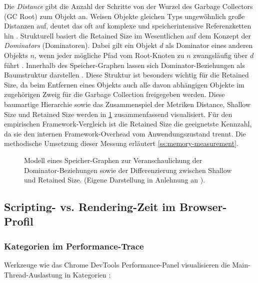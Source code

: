 Die \textit{Distance} gibt die Anzahl der Schritte von der Wurzel des Garbage Collectors (GC Root) zum Objekt an. Weisen Objekte gleichen Typs ungewöhnlich große Distanzen auf, deutet das oft auf komplexe und speicherintensive Referenzketten hin \cite{chrome-memory-terminology-2024}. Strukturell basiert die Retained Size im Wesentlichen auf dem Konzept der \textit{Dominators} (Dominatoren). Dabei gilt ein Objekt $d$ als Dominator eines anderen Objekts $n$, wenn jeder mögliche Pfad vom Root-Knoten zu $n$ zwangsläufig über $d$ führt \cite{bynens-lorenz-memory-profiling}. Innerhalb des Speicher-Graphen lassen sich Dominator-Beziehungen als Baumstruktur darstellen \cite{chrome-memory-terminology-2024}. Diese Struktur ist besonders wichtig für die Retained Size, da beim Entfernen eines Objekts auch alle davon abhängigen Objekte im zugehörigen Zweig für die Garbage Collection freigegeben werden. Diese baumartige Hierarchie sowie das Zusammenspiel der Metriken Distance, Shallow Size und Retained Size werden in \cref{fig:heap_dominator_tree} zusammenfassend visualisiert. Für den empirischen Framework-Vergleich ist die Retained Size die geeignetste Kennzahl, da sie den internen Framework-Overhead vom Anwendungszustand trennt. Die methodische Umsetzung dieser Messung erläutert \cref{ss:memory-measurement}.
\begin{figure}[H]
	\centering
	\caption[Modell eines Speicher-Graphen zur Darstellung der Retained Size]{Modell eines Speicher-Graphen zur Veranschaulichung der Dominator-Beziehungen sowie der Differenzierung zwischen Shallow und Retained Size. (Eigene Darstellung in Anlehnung an \cite{chrome-memory-terminology-2024}).}
	\label{fig:heap_dominator_tree}
\end{figure}

\subsection{Scripting- vs. Rendering-Zeit im Browser-Profil}
\label{ss:profiling-categories}

\subsubsection{Kategorien im Performance-Trace}
Werkzeuge wie das Chrome DevTools Performance-Panel visualisieren die Main-Thread-Auslastung in Kategorien \cite{chrome-performance-reference-2024}:

